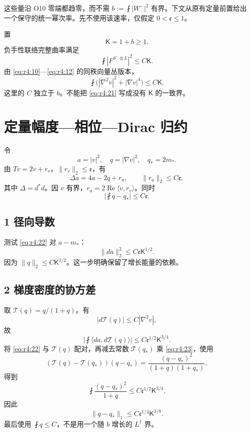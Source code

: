\documentclass[UTF8,11pt,fontset=none]{ctexart}
\begin{document}
这些量沿 O10 零端都趋零，而不需 \(b:=\fint|W^-|^2\) 有界。下文从原有定量前置给出一个保守的统一幂次率。先不使用该速率，仅假定 \(0<\mathfrak e\le1\)。

置 \[
\mathsf K=1+b\ge1.
\] 负手性联络完整曲率满足 \[
\fint|F^{S^-\otimes L}|^2\le C\mathsf K.
\] 由 \eqref{eq:r4:10}---\eqref{eq:r4:12} 的同秩向量丛版本， \[
\boxed{
\fint\bigl(|\nabla^2v|^2+|\nabla v|^4\bigr)\le C\mathsf K.
}
\tag{4.21}\label{eq:r4:21}
\] 这里的 \(C\) 独立于 \(b\)。不能把 \eqref{eq:r4:21} 写成没有 \(\mathsf K\) 的一致界。

\section{定量幅度---相位---Dirac 归约}\label{ch4:ux5b9aux91cfux5e45ux5ea6ux76f8ux4f4ddirac-ux5f52ux7ea6}

令 \[
a=|v|^2,\quad q=|\nabla v|^2,\quad q_*=2m_*.
\] 由 \(Tv=2v+r_v\)，\(\|r_v\|_2\le\mathfrak e\)，有 \[
\Delta a=4a-2q+r_a,\qquad
\|r_a\|_2\le C\mathfrak e,
\tag{4.22}\label{eq:r4:22}
\] 其中 \(\Delta=d^*d\)。因 \(v\) 有界，\(r_a=2\operatorname{Re}\langle v,r_v\rangle\)。同时 \[
\left|\fint q-q_*\right|\le C\mathfrak e.
\tag{4.23}\label{eq:r4:23}
\]

\subsection{1 径向导数}\label{ch4:ux5f84ux5411ux5bfcux6570}

测试 \eqref{eq:r4:22} 对 \(a-m_*\)： \[
\boxed{
\|da\|_2^2\le C\mathfrak e\mathsf K^{1/2}.
}
\tag{4.24}\label{eq:r4:24}
\] 因为 \(\|q\|_2\le C\mathsf K^{1/2}\)。这一步明确保留了增长能量的依赖。

\subsection{2 梯度密度的协方差}\label{ch4:ux68afux5ea6ux5bc6ux5ea6ux7684ux534fux65b9ux5dee}

取 \(\mathcal T(q)=q/(1+q)\)。有 \[
|d\mathcal T(q)|\le C|\nabla^2v|,
\] 故 \[
\left|\fint\langle da,d\mathcal T(q)\rangle\right|
\le C\mathfrak e^{1/2}\mathsf K^{3/4}.
\] 将 \eqref{eq:r4:22} 与 \(\mathcal T(q)\) 配对，再减去常数 \(\mathcal T(q_*)\) 乘 \eqref{eq:r4:23}，使用 \[
(\mathcal T(q)-\mathcal T(q_*))(q-q_*)
=\frac{(q-q_*)^2}{(1+q)(1+q_*)},
\] 得到 \[
\boxed{
\fint\frac{(q-q_*)^2}{1+q}
\le C\mathfrak e^{1/2}\mathsf K^{3/4}.
}
\tag{4.25}\label{eq:r4:25}
\] 因此 \[
\boxed{
\|q-q_*\|_1\le C\mathfrak e^{1/4}\mathsf K^{3/8}.
}
\tag{4.26}\label{eq:r4:26}
\] 最后使用 \(\fint q\le C\)，不是用一个随 \(b\) 增长的 \(L^1\) 界。
\end{document}
